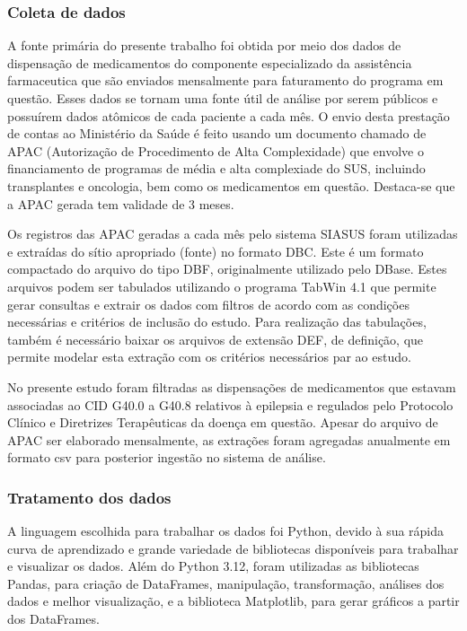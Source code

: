 \documentclass[article,a4paper,12pt,brazil,sumario=tradicional]{abntex2}
\begin{document}
\subsubsection{Coleta de dados}

A fonte primária do presente trabalho foi obtida por meio dos dados de dispensação de medicamentos do componente especializado da assistência farmaceutica que são enviados mensalmente para faturamento do programa em questão. Esses dados se tornam uma fonte útil de análise por serem públicos e possuírem dados atômicos de cada paciente a cada mês. O envio desta prestação de contas ao Ministério da Saúde é feito usando um documento chamado de APAC (Autorização de Procedimento de Alta Complexidade) que envolve o financiamento de programas de média e alta complexiade do SUS, incluindo transplantes e oncologia, bem como os medicamentos em questão. Destaca-se que a APAC gerada tem validade de 3 meses.

Os registros das APAC geradas a cada mês pelo sistema SIASUS foram utilizadas e extraídas do sítio apropriado (fonte) no formato DBC. Este é um formato compactado do arquivo do tipo DBF, originalmente utilizado pelo DBase. Estes arquivos podem ser tabulados utilizando o programa TabWin 4.1 que permite gerar consultas e extrair os dados com filtros de acordo com as condições necessárias e critérios de inclusão do estudo. Para realização das tabulações, também é necessário baixar os arquivos de extensão DEF, de definição, que permite modelar esta extração com os critérios necessários par ao estudo.

No presente estudo foram filtradas as dispensações de medicamentos que estavam associadas ao CID G40.0 a G40.8 relativos à epilepsia e regulados pelo Protocolo Clínico e Diretrizes Terapêuticas da doença em questão. Apesar do arquivo de APAC ser elaborado mensalmente, as extrações foram agregadas anualmente em formato csv para posterior ingestão no sistema de análise.

\subsubsection{Tratamento dos dados}
 
A linguagem escolhida para trabalhar os dados foi Python, devido à sua rápida curva de aprendizado e grande variedade de bibliotecas disponíveis para trabalhar e visualizar os dados. Além do Python 3.12, foram utilizadas as bibliotecas Pandas, para criação de DataFrames, manipulação, transformação, análises dos dados e melhor visualização, e a biblioteca Matplotlib, para gerar gráficos a partir dos DataFrames.
\end{document}
